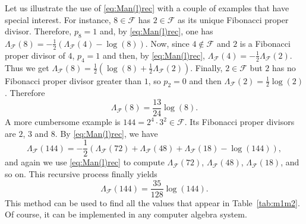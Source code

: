\documentclass[11pt, a4paper]{article}
\newcommand{\calF}{\mathcal{F}}
\newcommand{\manF}{\Lambda_{\mathcal{F}}}
\theoremstyle{plain}
\theoremstyle{definition}
\begin{document}
Let us illustrate the use of \eqref{eq:Man(l)rec} with a couple of examples that have special interest. For instance, $8\in \calF$ has $2\in \calF$ as its unique Fibonacci
proper divisor. Therefore, $p_{8}=1$ and, by \eqref{eq:Man(l)rec}, one has 
$\manF(8) = -\frac{1}{2}(\manF(4)-\log(8))$. Now, since $4\notin \calF$
and $2$ is a Fibonacci proper divisor of $4$, $p_{4}=1$ and then, by \eqref{eq:Man(l)rec}, 
$\manF(4) = -\frac{1}{2} \manF(2)$. Thus we get 
$\manF(8) = \frac{1}{2} \left(\log(8) + \frac{1}{2} \manF(2)\right)$. 
Finally, $2\in \calF$ but $2$ has no
Fibonacci proper divisor greater than $1$, so $p_2=0$ and then 
$\manF(2) = \frac{1}{2} \log(2)$. Therefore 
\begin{equation}
\label{eq:Man(8)}
\manF(8) = \frac{13}{24} \log(8). 
\end{equation}
A more cumbersome example is $144 = 2^4\cdot3^2 \in \calF$. Its Fibonacci proper divisors are $2$, $3$ and $8$. By \eqref{eq:Man(l)rec}, we have
\[
\manF(144) = -\frac{1}{2}(\manF(72)+\manF(48)+\manF(18)-\log(144)),
\]
and again we use \eqref{eq:Man(l)rec} to compute $\manF(72)$, $\manF(48)$, $\manF(18)$,
and so on. This recursive process finally yields
\begin{equation}
\label{eq:Man(144)}
\manF(144) = \frac{35}{128} \log(144). 
\end{equation}
This method can be used to find all the values that appear in Table~\ref{tab:m1m2}.
Of course, it can be implemented in any computer algebra system.
\end{document}
